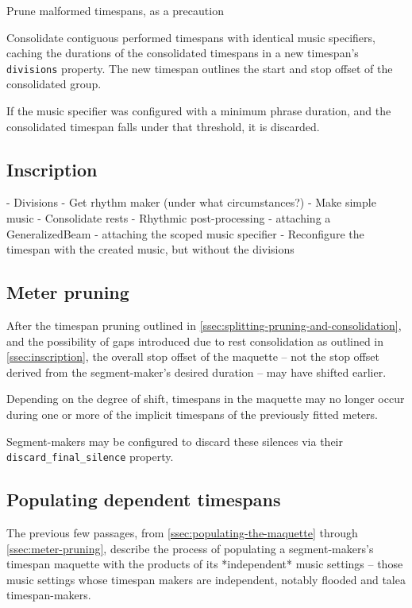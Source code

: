 Prune malformed timespans, as a precaution

Consolidate contiguous performed timespans with identical music specifiers,
caching the durations of the consolidated timespans in a new timespan's
\texttt{divisions} property. The new timespan outlines the start and stop
offset of the consolidated group.

If the music specifier was configured with a minimum phrase duration, and the
consolidated timespan falls under that threshold, it is discarded.

\subsection{Inscription}
\label{ssec:inscription}

\begin{markdown}
-   Divisions
-   Get rhythm maker (under what circumstances?)
-   Make simple music
-   Consolidate rests
-   Rhythmic post-processing
    -   attaching a GeneralizedBeam
    -   attaching the scoped music specifier
-   Reconfigure the timespan with the created music, but without the divisions
\end{markdown}

\subsection{Meter pruning}
\label{ssec:meter-pruning}

After the timespan pruning outlined in
\autoref{ssec:splitting-pruning-and-consolidation}, and the possibility of gaps
introduced due to rest consolidation as outlined in \autoref{ssec:inscription},
the overall stop offset of the maquette -- not the stop offset derived from the
segment-maker's desired duration -- may have shifted earlier.

Depending on the degree of shift, timespans in the maquette may no longer occur
during one or more of the implicit timespans of the previously fitted meters.

Segment-makers may be configured to discard these silences via their
\texttt{discard\_final\_silence} property.

\subsection{Populating dependent timespans}
\label{ssec:populating-dependent-timespans}

The previous few passages, from \autoref{ssec:populating-the-maquette} through
\autoref*{ssec:meter-pruning}, describe the process of populating a
segment-makers's timespan maquette with the products of its *independent* music
settings -- those music settings whose timespan makers are independent, notably
flooded and talea timespan-makers.

